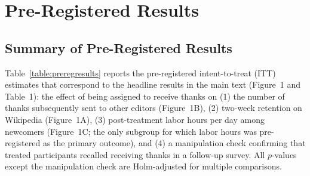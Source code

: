 \documentclass[9pt,twoside,lineno]{pnas-new}
\begin{document}



\section*{Pre-Registered Results}

\subsection*{Summary of Pre-Registered Results}
Table~\ref{table:preregresults} reports the pre-registered intent-to-treat (ITT) estimates that correspond to the headline results in the main text (Figure~1 and Table~1): the effect of being assigned to receive thanks on (1) the number of thanks subsequently sent to other editors (Figure~1B), (2) two-week retention on Wikipedia (Figure~1A), (3) post-treatment labor hours per day among newcomers (Figure~1C; the only subgroup for which labor hours was pre-registered as the primary outcome), and (4) a manipulation check confirming that treated participants recalled receiving thanks in a follow-up survey. All $p$-values except the manipulation check are Holm-adjusted for multiple comparisons.


\end{document}
